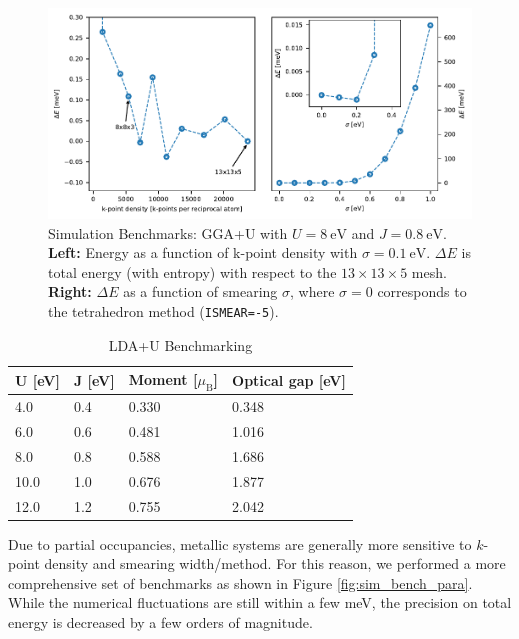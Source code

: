 \begin{figure}
    \centering
    \includegraphics{fig/simulation/convergence_afm.pdf}
    \caption[Simulation Benchmarks: GGA+U]{Simulation Benchmarks: GGA+U with $U=\SI{8}{\eV}$ and $J=\SI{0.8}{\eV}$. \textbf{Left:} Energy as a function of k-point density with $\sigma=\SI{0.1}{\eV}$. $\Delta E$ is total energy (with entropy) with respect to the $13 \times 13 \times 5$ mesh. \textbf{Right:} $\Delta E$ as a function of smearing $\sigma$, where $\sigma=0$ corresponds to the tetrahedron method (\texttt{ISMEAR=-5}).}
    \label{fig:sim_bench_afm}
\end{figure}

\begin{table}[b]
	\centering
	\begin{tabular}{@{}llll@{}}
		\toprule
		U [eV] & J [eV] & Moment [$\mu_\text{B}$] & Optical gap [eV] \\ \midrule
		4.0    & 0.4    & 0.330       & 0.348    \\
		6.0    & 0.6    & 0.481       & 1.016    \\
		8.0    & 0.8    & 0.588       & 1.686    \\
		10.0   & 1.0    & 0.676       & 1.877    \\
		12.0   & 1.2    & 0.755       & 2.042    \\ \bottomrule
	\end{tabular}
	\caption[LDA+U Benchmarking]{LDA+U Benchmarking}
	\label{tab:ldau}
\end{table}

Due to partial occupancies, metallic systems are generally more sensitive to $k$-point density and smearing width/method. For this reason, we performed a more comprehensive set of benchmarks as shown in Figure \ref{fig:sim_bench_para}. While the numerical fluctuations are still within a few meV, the precision on total energy is decreased by a few orders of magnitude.

